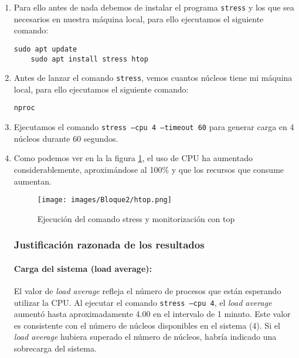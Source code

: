 \begin{enumerate}
    \item Para ello antes de nada debemos de instalar el programa \texttt{stress} y los que sea necesarios en nuestra máquina local, para ello ejecutamos el siguiente comando:

    \begin{lstlisting}[style=customstyle]
    sudo apt update
    sudo apt install stress htop
    \end{lstlisting}

    \item Antes de lanzar el comando \texttt{stress}, vemos cuantos núcleos tiene mi máquina local, para ello ejecutamos el siguiente comando:
    \begin{lstlisting}[style=customstyle]
    nproc
    \end{lstlisting}

    \item Ejecutamos el comando \texttt{stress --cpu 4 --timeout 60} para generar carga en 4 núcleos durante 60 segundos.
    
    \item Como podemos ver en la la figura \ref{fig:stress-top}, el uso de CPU ha aumentado considerablemente, aproximándose al 100\% y que los recursos que consume aumentan.
    \begin{figure}[H]
        \centering
        \texttt{[image: images/Bloque2/htop.png]}
        \caption{Ejecución del comando stress y monitorización con top}
        \label{fig:stress-top}
    \end{figure}

    \subsubsection*{Justificación razonada de los resultados}

    \paragraph{Carga del sistema (load average):}
    El valor de \textit{load average} refleja el número de procesos que están esperando utilizar la CPU. Al ejecutar el comando \texttt{stress --cpu 4}, el \textit{load average} aumentó hasta aproximadamente 4.00 en el intervalo de 1 minuto. Este valor es consistente con el número de núcleos disponibles en el sistema (4). Si el \textit{load average} hubiera superado el número de núcleos, habría indicado una sobrecarga del sistema.


\end{enumerate}
